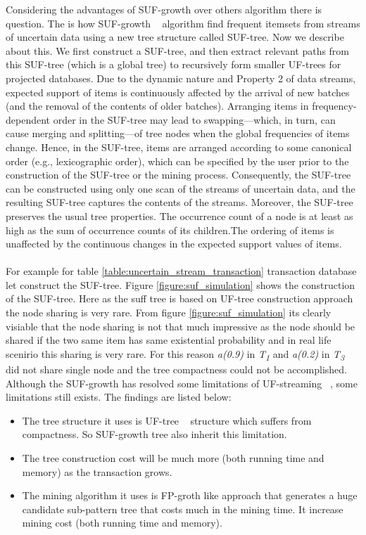 	Considering the advantages of SUF-growth over others algorithm there is question. The is how SUF-growth ~\cite{suf_growth} algorithm find frequent itemsets from streams of uncertain data using a new tree structure called SUF-tree. Now we describe about this. We ﬁrst construct a SUF-tree, and then extract relevant paths from this SUF-tree (which is a global tree) to recursively form smaller UF-trees for projected databases. Due to the dynamic nature and Property 2 of data streams, expected support of items is continuously affected by the arrival of new batches (and the removal of the contents of older batches). Arranging items in frequency-dependent order in the SUF-tree may lead to swapping—which, in turn, can cause merging and splitting—of tree nodes when the global frequencies of items change. Hence, in the SUF-tree, items are arranged according to some canonical order (e.g., lexicographic order), which can be speciﬁed by the user prior to the construction of the SUF-tree or the mining process. Consequently, the SUF-tree can be constructed using only one scan of the streams of uncertain data, and the resulting SUF-tree captures the contents of the streams. Moreover, the SUF-tree preserves the usual tree properties. The occurrence count of a node is at least as high as the sum of occurrence counts of its children.The ordering of items is unaffected by the continuous changes in the expected support values of items.\\ \\
	For example for table \ref{table:uncertain_stream_transaction} transaction database let construct the SUF-tree. Figure \ref{figure:suf_simulation} shows the construction of the SUF-tree. Here as the suff tree is based on UF-tree construction approach the node sharing is very rare. From figure \ref{figure:suf_simulation} its clearly visiable that the node sharing is not that much impressive as the node should be shared if the two same item has same existential probability and in real life scenirio this sharing is very rare. For this reason \emph{a(0.9)} in \emph{T\textsubscript{1}} and \emph{a(0.2)} in \emph{T\textsubscript{3}} did not share single node and the tree compactness could not be accomplished.
	Although the SUF-growth has resolved some limitations of UF-streaming ~\cite{suf_growth}, some limitations still exists. The findings are listed below:
	\begin{itemize}
		\item The tree structure it uses is UF-tree ~\cite{uf_growth} structure which suffers from compactness. So SUF-growth tree also inherit this limitation.
		\item The tree construction cost will be much more (both running time and memory) as the transaction grows.
		\item The mining algorithm it uses is FP-groth like approach that generates a huge candidate sub-pattern tree that costs much in the mining time. It increase mining cost (both running time and memory).
 	\end{itemize}
	

